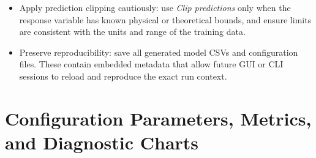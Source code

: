 \documentclass[11pt,a4paper]{article}
\begin{document}
\begin{itemize}
  \item Apply prediction clipping cautiously: use \emph{Clip predictions} only when the response variable has known physical or theoretical bounds, and ensure limits are consistent with the units and range of the training data.
  \item Preserve reproducibility: save all generated model CSVs and configuration files. These contain embedded metadata that allow future GUI or CLI sessions to reload and reproduce the exact run context.
\end{itemize}

\section{Configuration Parameters, Metrics, and Diagnostic Charts}
\end{document}
